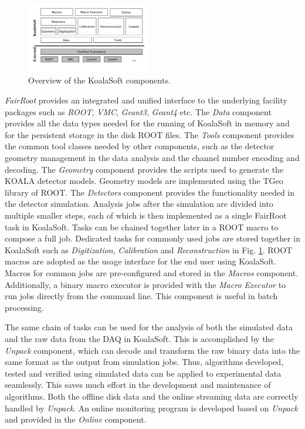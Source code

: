 \documentclass[number,5p]{elsarticle}
\begin{document}
\begin{figure}[htbp]
  \centering
  \includegraphics[width=0.48\textwidth]{./koalasoft_components.png}
  \caption{Overview of the KoalaSoft components.}
  \label{fig:koalasoft}
\end{figure}

\textit{FairRoot} provides an integrated and unified interface to the underlying facility
packages such as \textit{ROOT}, \textit{VMC}, \textit{Geant3}, \textit{Geant4} etc.
The \textit{Data} component provides all the data types needed for the running
of KoalaSoft in memory and for the persistent storage in the disk ROOT files.
The \textit{Tools} component provides the common tool classes needed by other
components, such as the detector geometry management in the data analysis and
the channel number encoding and decoding.
The \textit{Geometry} component provides the scripts  used to generate the KOALA detector models.
Geometry models are implemented using the TGeo library of ROOT.
The \textit{Detectors} component provides the functionality needed in the
detector simulation.
Analysis jobs after the simulation are divided into multiple smaller steps, each of which is
then implemented as a single FairRoot task in KoalaSoft.
Tasks can be chained together later in a ROOT macro to compose a full job. 
Dedicated tasks for commonly used jobs are stored together in KoalaSoft such as
\textit{Digitization}, \textit{Calibration} and \textit{Reconstruction} in
Fig. \ref{fig:koalasoft}.
ROOT macros are adopted as the usage interface for the end user using KoalaSoft.
Macros for common jobs are pre-configured and stored in the \textit{Macros} component.
Additionally, a binary macro executor is provided with the \textit{Macro
  Executor} to run jobs directly from the command line. This component is useful in batch processing.

The same chain of tasks can be used for the analysis of both the simulated data
and the raw data from the DAQ in KoalaSoft.
This is accomplished by the \textit{Unpack} component, which can decode and transform the raw binary data into the same format as the output from simulation jobs.
Thus, algorithms developed, tested and verified using simulated data can be applied to experimental data seamlessly.
This saves much effort in the development and maintenance of algorithms.
Both the offline disk data and the online streaming data are correctly handled
by \textit{Unpack}.
An online monitoring program is developed based on \textit{Unpack} and provided
in the \textit{Online} component.
\end{document}
